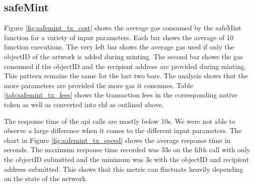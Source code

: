 \subsection*{safeMint}
Figure \ref{fig:safemint_tx_cost} shows the average gas consumed by the safeMint function for a variety of input parameters. Each bar shows the average of 10 function executions. The very left bar shows the average gas used if only the objectID of the artwork is added during minting. The second bar shows the gas consumed if the objectID and the recipient address are provided during minting. This pattern remains the same for the last two bars. The analysis shows that the more parameters are provided the more gas it consumes. Table \ref{tab:safemint_tx_fees} shows the transaction fees in the corresponding native token as well as converted into \gls{chf} as outlined above. 

\begin{table}[h]
\caption{Estimated transaction fees safeMint}
\label{tab:safemint_tx_fees}
\end{table}

The response time of the \gls{api} calls are mostly below 10s. We were not able to observe a large difference when it comes to the different input parameters. The chart in Figure \ref{fig:safemint_tx_speed} shows the average response time in seconds. The maximum response time recorded was 33s on the fifth call with only the objectID submitted and the minimum was 3s with the objectID and recipient address submitted. This shows that this metric can fluctuate heavily depending on the state of the network.

